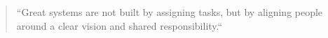 {}

\begin{quote}
``Great systems are not built by assigning tasks, but by aligning people around a clear vision and shared responsibility.``
\end{quote}

\divider\smallskip



\divider\smallskip


